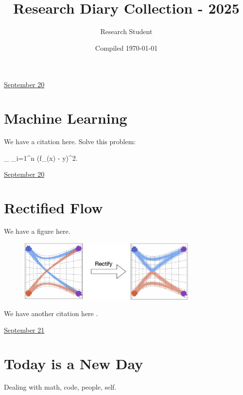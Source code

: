 \documentclass[letterpaper,11pt]{article}
\title{Research Diary Collection - 2025}
\author{Research Student}
\date{Compiled \today}
\begin{document}
\tableofcontents
\thispagestyle{empty}
\newpage


\href{run:2025-09-20-newmethod.tex}{\Huge September 20} 

\section{Machine Learning}

We have a citation \cite{research_methods2024} here.  Solve this problem: 

\bb 
\min_{\theta} \sum_{i=1}^n (f_\theta(x\datai) - y\datai)^2. 
\ee 


\clearpage


\href{run:2025-09-20.tex}{\Huge September 20} 

\section{Rectified Flow}

We have a figure here. 
\begin{figure}[h]
\centering 
\includegraphics[width=0.8\textwidth]{assets/figures/2025/curved_reflow.png}
\end{figure} 


We have another citation here \cite{li2022diffusion}. 


\clearpage


\href{run:2025-09-21.tex}{\Huge September 21} 

\section{Today is a New Day}

Dealing with math, code, people, self. 



\clearpage




\end{document}
